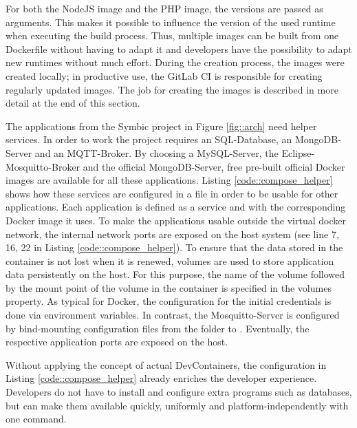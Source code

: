         
        For both the NodeJS image and the PHP image, the versions are passed as arguments. This makes it possible to influence the version of the used runtime when executing the build process. Thus, multiple images can be built from one Dockerfile without having to adapt it and developers have the possibility to adapt new runtimes without much effort. During the creation process, the images were created locally; in productive use, the GitLab \ac{CI} is responsible for creating regularly updated images. The job for creating the images is described in more detail at the end of this section.

        The applications from the Symbic project in Figure \ref{fig::arch} need helper services. In order to work the project requires an SQL-Database, an MongoDB-Server and an MQTT-Broker. By choosing a MySQL-Server, the Eclipse-Mosquitto-Broker and the official MongoDB-Server, free pre-built official Docker images are available for all these applications. Listing \ref{code::compose_helper} shows how these services are configured in a  file in order to be usable for other applications. Each application is defined as a service and with the corresponding Docker image it uses. To make the applications usable outside the virtual docker network, the internal network ports are exposed on the host system (see line 7, 16, 22 in Listing \ref{code::compose_helper}). To ensure that the data stored in the container is not lost when it is renewed, volumes are used to store application data persistently on the host. For this purpose, the name of the volume followed by the mount point of the volume in the container is specified in the volumes property. As typical for Docker, the configuration for the initial credentials is done via environment variables. In contrast, the Mosquitto-Server is configured by bind-mounting configuration files from the  folder to . Eventually, the respective application ports are exposed on the host.\newline
        
        Without applying the concept of actual DevContainers, the configuration in Listing \ref{code::compose_helper} already enriches the developer experience. Developers do not have to install and configure extra programs such as databases, but can make them available quickly, uniformly and platform-independently with one command.\newline
